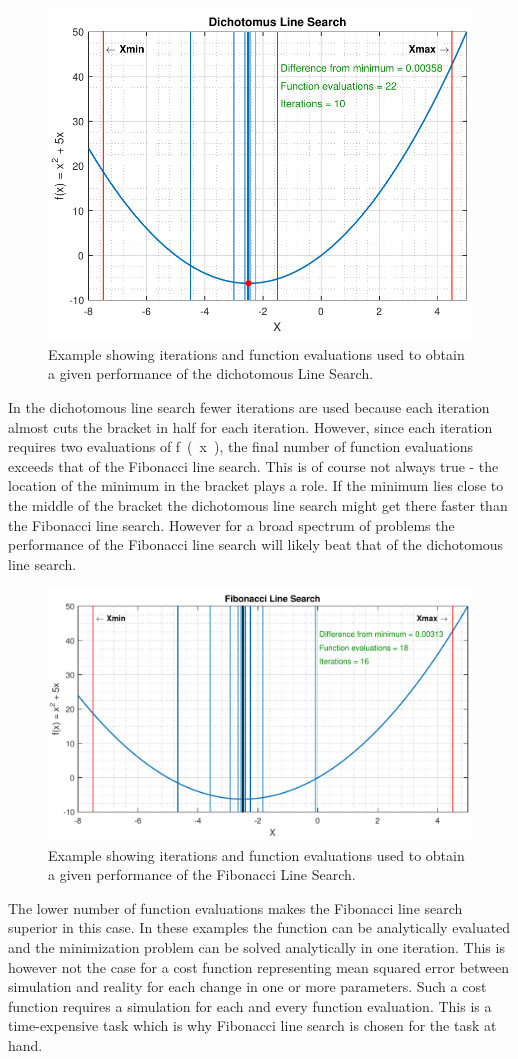 \begin{figure}[H] 
	\centering
	\includegraphics[width=.5\textwidth]{figures/dichotomousLineSearchPerformance}
	\caption{Example showing iterations and function evaluations used to obtain a given performance of the dichotomous Line Search.}
	\label{dichotomousLineSearchPerformance}
\end{figure}

In the dichotomous line search fewer iterations are used because each iteration almost cuts the bracket in half for each iteration. However, since each iteration requires two evaluations of \si{f(x)}, the final number of function evaluations exceeds that of the Fibonacci line search. This is of course not always true - the location of the minimum in the bracket plays a role. If the minimum lies close to the middle of the bracket the dichotomous line search might get there faster than the Fibonacci line search. However for a broad spectrum of problems the performance of the Fibonacci line search will likely beat that of the dichotomous line search.

\begin{figure}[H] 
	\centering
	\includegraphics[width=.55\textwidth]{figures/fibonacciLineSearchPerformance}
	\caption{Example showing iterations and function evaluations used to obtain a given performance of the Fibonacci Line Search.}
	\label{fibonacciLineSearchPerformance}
\end{figure}

The lower number of function evaluations makes the Fibonacci line search superior in this case. In these examples the function can be analytically evaluated and the minimization problem can be solved analytically in one iteration. This is however not the case for a cost function representing mean squared error between simulation and reality for each change in one or more parameters. Such a cost function requires a simulation for each and every function evaluation. This is a time-expensive task which is why Fibonacci line search is chosen for the task at hand.